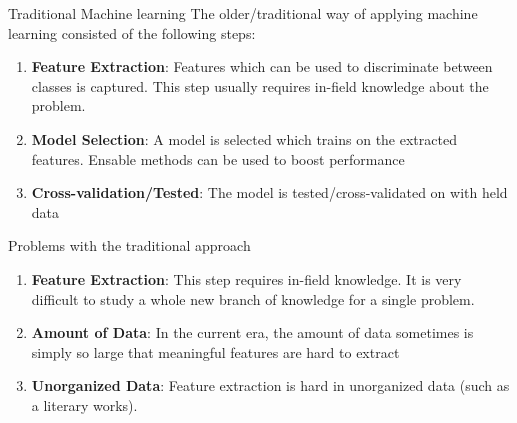 


\begin{frame}
\end{frame}

\usebackgroundtemplate{ }



\begin{frame}{Traditional Machine learning}
The older/traditional way of applying machine learning consisted of the following steps:
	\begin{enumerate}[$\bullet$]
		\item \textbf{Feature Extraction}: Features which can be used to discriminate between classes is captured. This step usually requires in-field knowledge about the problem.\pause
		\item \textbf{Model Selection}: A model is selected which trains on the extracted features. Ensable methods can be used to boost performance\pause
		\item \textbf{Cross-validation/Tested}: The model is tested/cross-validated on with held data
	\end{enumerate}
\end{frame}

\begin{frame}{Problems with the traditional approach}
	  \begin{enumerate}[$\bullet$]
		  \item \textbf{Feature Extraction}: This step requires in-field knowledge. It is very difficult to study  a whole new branch of knowledge for a single problem.\pause
		  \item \textbf{Amount of Data}: In the current era, the amount of data sometimes is simply so large that meaningful features are hard to extract \pause
		  \item \textbf{Unorganized Data}: Feature extraction is hard in unorganized data (such as a literary works).
	  \end{enumerate}
  \end{frame}

